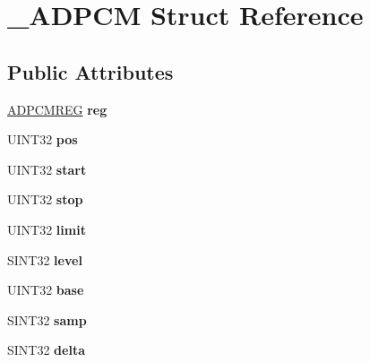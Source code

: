 \hypertarget{struct__ADPCM}{\section{\-\_\-\-A\-D\-P\-C\-M Struct Reference}
\label{struct__ADPCM}
}
\subsection*{Public Attributes}
\begin{DoxyCompactItemize}
\item 
\hypertarget{struct__ADPCM_ac312507a5ca0653b3a3e7e9e8dc423b4}{\hyperlink{structADPCMREG}{A\-D\-P\-C\-M\-R\-E\-G} {\bfseries reg}}\label{struct__ADPCM_ac312507a5ca0653b3a3e7e9e8dc423b4}

\item 
\hypertarget{struct__ADPCM_a8f6d17fe1b2c28b9b1ab2dee3f2eb383}{U\-I\-N\-T32 {\bfseries pos}}\label{struct__ADPCM_a8f6d17fe1b2c28b9b1ab2dee3f2eb383}

\item 
\hypertarget{struct__ADPCM_ae6730e8f88b7a9fb0951cc118afa9f23}{U\-I\-N\-T32 {\bfseries start}}\label{struct__ADPCM_ae6730e8f88b7a9fb0951cc118afa9f23}

\item 
\hypertarget{struct__ADPCM_ac4c44c7c8154a03cc5e94d7f3341f370}{U\-I\-N\-T32 {\bfseries stop}}\label{struct__ADPCM_ac4c44c7c8154a03cc5e94d7f3341f370}

\item 
\hypertarget{struct__ADPCM_a17d011b6f3eb2d3ef499eb2ebea7eb04}{U\-I\-N\-T32 {\bfseries limit}}\label{struct__ADPCM_a17d011b6f3eb2d3ef499eb2ebea7eb04}

\item 
\hypertarget{struct__ADPCM_a381f2ddafdbde4ffa227ad52fd530f8b}{S\-I\-N\-T32 {\bfseries level}}\label{struct__ADPCM_a381f2ddafdbde4ffa227ad52fd530f8b}

\item 
\hypertarget{struct__ADPCM_aae3b2edacf74cbf0305e90fd62a3d22e}{U\-I\-N\-T32 {\bfseries base}}\label{struct__ADPCM_aae3b2edacf74cbf0305e90fd62a3d22e}

\item 
\hypertarget{struct__ADPCM_a1668a7f9ad021f4a9b01be2d59619801}{S\-I\-N\-T32 {\bfseries samp}}\label{struct__ADPCM_a1668a7f9ad021f4a9b01be2d59619801}

\item 
\hypertarget{struct__ADPCM_a4bc9dcb9256bbf7e69a20813b5ade007}{S\-I\-N\-T32 {\bfseries delta}}\label{struct__ADPCM_a4bc9dcb9256bbf7e69a20813b5ade007}


\end{DoxyCompactItemize}
